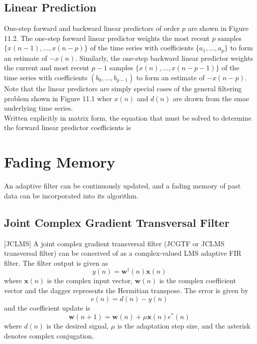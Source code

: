 \documentclass[11pt]{report}
\theoremstyle{example}
\begin{document}
\subsection{Linear Prediction}
One-step forward and backward linear predictors of order $p$ are shown in Figure 11.2. The one-step forward linear predictor weights the most recent $p$ samples $\{x(n-1),\ldots,x(n-p)\}$ of the time series with coefficients $\{a_1,\ldots,a_p\}$ to form an estimate of $-x(n)$. Similarly, the one-step backward linear predictor weights the current and most recent $p-1$ samples $\{x(n),\ldots,x(n-p-1)\}$ of the time series with coefficients $(b_0,\ldots,b_{p-1})$ to form an estimate of $-x(n-p)$. Note that the linear predictors are simply special cases of the general filtering problem shown in Figure 11.1 wher $x(n)$ and $d(n)$ are drawn from the smae underlying time series.\\
Written explicitly in matrix form, the equation that must be solved to determine the forward linear predictor coefficients is

\section {Fading Memory}
An adaptive filter can be continuously updated, and a fading memory of past data can be incorporated into its algorithm.

\subsection{Joint Complex Gradient Transversal Filter}[JCLMS]
A joint complex gradient transversal filter (JCGTF or JCLMS transversal filter) can be conceived of as a complex-valued LMS adaptive FIR filter. The filter output is given as
\begin{equation}
	y(n)=\mathbf{w}^\dagger(n)\mathbf{x}(n)
\end{equation}
where $\mathbf{x}(n)$ is the complex input vector, $\mathbf{w}(n)$ is the complex coefficient vector and the dagger represents the Hermitian transpose. The error is given by
\begin{equation}
	e(n)=d(n)-y(n)
\end{equation}
and the coefficient update is
\begin{equation}
	\mathbf{w}(n+1)=\mathbf{w}(n)+\mu\mathbf{x}(n)e^*(n)
\end{equation}
where $d(n)$ is the desired signal, $\mu$ is the adaptation step size, and the asterisk denotes complex conjugation.
\end{document}
